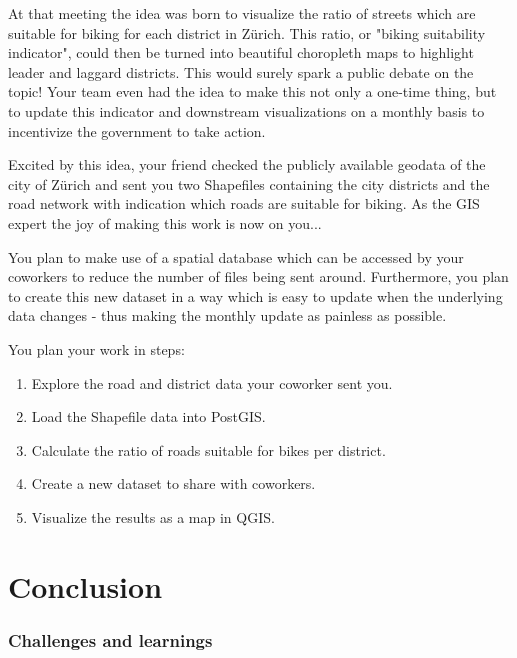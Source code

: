 \documentclass[11pt, a4paper, oneside, parskip=full-]{scrartcl}
\begin{document}
At that meeting the idea was born to visualize the ratio of streets which are
suitable for biking for each district in Zürich. This ratio, or "biking
suitability indicator", could then be turned into beautiful choropleth maps to
highlight leader and laggard districts. This would surely spark a public debate
on the topic! Your team even had the idea to make this not only a one-time
thing, but to update this indicator and downstream visualizations on a monthly
basis to incentivize the government to take action.

Excited by this idea, your friend checked the publicly available geodata of the
city of Zürich and sent you two Shapefiles containing the city districts and the
road network with indication which roads are suitable for biking. As the GIS
expert the joy of making this work is now on you...

You plan to make use of a spatial database which can be accessed by your
coworkers to reduce the number of files being sent around. Furthermore, you plan
to create this new dataset in a way which is easy to update when the underlying
data changes - thus making the monthly update as painless as possible.

You plan your work in steps:
\begin{enumerate}
  \item Explore the road and district data your coworker sent you.
  \item Load the Shapefile data into PostGIS.
  \item Calculate the ratio of roads suitable for bikes per district.
  \item Create a new dataset to share with coworkers.
  \item Visualize the results as a map in QGIS.
\end{enumerate}

\section{Conclusion}

\subsubsection*{Challenges and learnings}

\printbibliography
\end{document}
